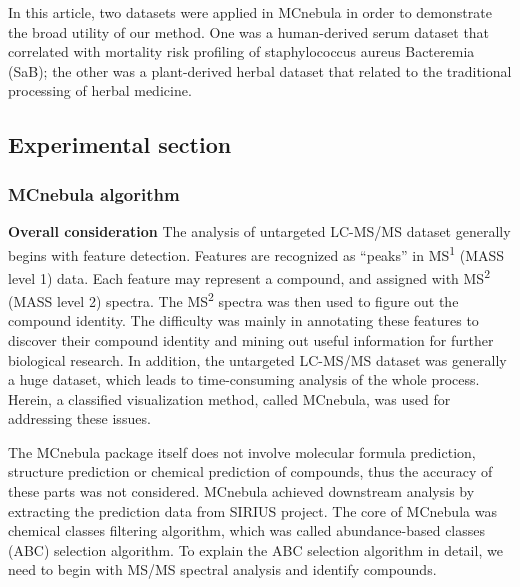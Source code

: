 \documentclass[
]{article}
\begin{document}
In this article, two datasets were applied in MCnebula in order to
demonstrate the broad utility of our method. One was a human-derived
serum dataset that correlated with mortality risk profiling of
staphylococcus aureus Bacteremia (SaB); the other was a plant-derived
herbal dataset that related to the traditional processing of herbal
medicine.

\hypertarget{experimental-section}{%
\subsection{Experimental section}\label{experimental-section}}

\hypertarget{mcnebula-algorithm}{%
\subsubsection{MCnebula algorithm}\label{mcnebula-algorithm}}

\textbf{Overall consideration} The analysis of untargeted LC-MS/MS
dataset generally begins with feature detection. Features are recognized
as ``peaks'' in MS\textsuperscript{1} (MASS level 1) data. Each feature
may represent a compound, and assigned with MS\textsuperscript{2} (MASS
level 2) spectra. The MS\textsuperscript{2} spectra was then used to
figure out the compound identity. The difficulty was mainly in
annotating these features to discover their compound identity and mining
out useful information for further biological research. In addition, the
untargeted LC-MS/MS dataset was generally a huge dataset, which leads to
time-consuming analysis of the whole process. Herein, a classified
visualization method, called MCnebula, was used for addressing these
issues.

The MCnebula package itself does not involve molecular formula
prediction, structure prediction or chemical prediction of compounds,
thus the accuracy of these parts was not considered. MCnebula achieved
downstream analysis by extracting the prediction data from SIRIUS
project. The core of MCnebula was chemical classes filtering algorithm,
which was called abundance-based classes (ABC) selection algorithm. To
explain the ABC selection algorithm in detail, we need to begin with
MS/MS spectral analysis and identify compounds.
\end{document}
